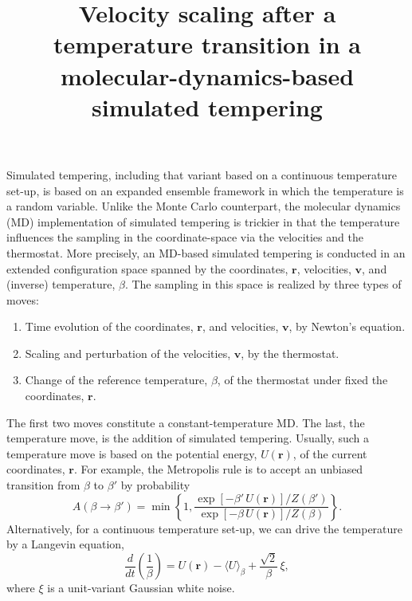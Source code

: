 \documentclass[11pt]{article}
\begin{document}
\title{Velocity scaling after a temperature transition in a molecular-dynamics-based simulated tempering}
\author{}
\date{\vspace{-10ex}}
\maketitle

Simulated tempering\cite{lyubartsev1992, marinari1992},
including that variant based on a continuous temperature set-up\cite{zhang2010},
is based on an expanded ensemble framework in which
the temperature is a random variable.
%
Unlike the Monte Carlo counterpart,
the molecular dynamics (MD) implementation of simulated tempering
is trickier in that the temperature influences
the sampling in the coordinate-space
via the velocities and the thermostat.
%
More precisely, an MD-based simulated tempering
is conducted in an extended configuration space
spanned by the coordinates, $\mathbf r$,
velocities, $\mathbf v$,
and (inverse) temperature, $\beta$.
%
The sampling in this space is realized
by three types of moves:
%
\begin{enumerate}
  \item
    Time evolution of the coordinates, $\mathbf r$, and velocities, $\mathbf v$, by Newton's equation.

  \item
    Scaling and perturbation of the velocities, $\mathbf v$, by the thermostat.

  \item
    Change of the reference temperature, $\beta$, of the thermostat
    under fixed the coordinates, $\mathbf r$.
\end{enumerate}
%
The first two moves constitute
a constant-temperature MD.
%
The last, the temperature move,
is the addition of simulated tempering.
%
Usually, such a temperature move is based on
the potential energy, $U(\mathbf r)$,
of the current coordinates, $\mathbf r$.
%
For example,
the Metropolis rule is to accept an unbiased transition
from $\beta$ to $\beta'$ by probability
%
\begin{equation}
  A(\beta \to \beta')
  =
  \min\left\{
    1,
    \frac{
      \exp[ -\beta' \, U(\mathbf r) ] / Z(\beta')
    }
    {
      \exp[ -\beta \, U(\mathbf r) ] / Z(\beta)
    }
  \right\}
  .
  \label{eq:Tmove_Metropolis}
\end{equation}
%
Alternatively, for a continuous temperature set-up,
we can drive the temperature by a Langevin equation\cite{zhang2010},
%
\begin{equation}
  \frac{ d } { dt }
  \left(
  \frac{ 1 } { \beta }
  \right)
  =
  U(\mathbf r)
  -
  \langle U \rangle_\beta
  +
  \frac{ \sqrt 2  } { \beta } \, \xi
  ,
  \label{eq:Tmove_Langevin}
\end{equation}
%
where $\xi$ is a unit-variant Gaussian white noise.
\end{document}
